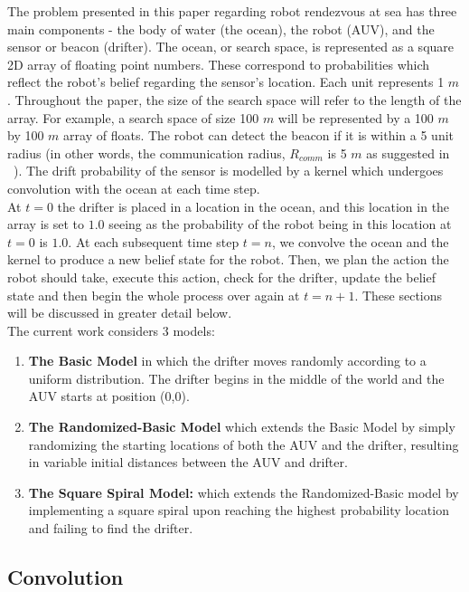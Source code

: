 \documentclass[a4paper, 11pt]{article} %
\begin{document}
The problem presented in this paper regarding robot rendezvous at sea has three main components - the body of water (the ocean), the robot (AUV), and the sensor or beacon (drifter). The ocean, or search space, is represented as a square 2D array of floating point numbers. These correspond to probabilities which reflect the robot's belief regarding the sensor's location. Each unit represents 1 $m$. Throughout the paper, the size of the search space will refer to the length of the array. For example, a search space of size 100 $m$ will be represented by a 100 $m$ by 100 $m$ array of floats. The robot can detect the beacon if it is within a 5 unit radius (in other words, the communication radius, $R_{comm}$ is 5 $m$ as suggested in ~\cite{meghjani14}). The drift probability of the sensor is modelled by a kernel which undergoes convolution with the ocean at each time step. 
\\

\noindent At $t=0$ the drifter is placed in a location in the ocean, and this location in the array is set to $1.0$ seeing as the probability of the robot being in this location at $t=0$ is $1.0$. At each subsequent time step $t=n$, we convolve the ocean and the kernel to produce a new belief state for the robot. Then, we plan the action the robot should take, execute this action, check for the drifter, update the belief state and then begin the whole process over again at $t=n+1$. These sections will be discussed in greater detail below. \\

\noindent The current work considers 3 models: 
\begin{enumerate}
\item \textbf{The Basic Model} in which the drifter moves randomly according to a uniform distribution. The drifter begins in the middle of the world and the AUV starts at position (0,0). 
\item \textbf{The Randomized-Basic Model} which extends the Basic Model by simply randomizing the starting locations of both the AUV and the drifter, resulting in variable initial distances between the AUV and drifter.
\item \textbf{The Square Spiral Model:} which extends the Randomized-Basic model by implementing a square spiral upon reaching the highest probability location and failing to find the drifter.
\end{enumerate}

\subsection*{Convolution}
\end{document}
